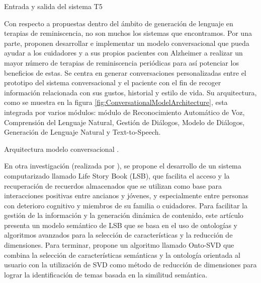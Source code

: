 %
{Entrada y salida del sistema T5}

Con respecto a propuestas dentro del ámbito de generación de lenguaje en terapias de reminiscencia, no son muchos los sistemas que encontramos. Por una parte, \citep{MoralesdeJess2020ACM} proponen desarrollar e implementar un modelo conversacional que pueda ayudar a los cuidadores y a sus propios pacientes con Alzheimer a realizar un mayor número de terapias de reminiscencia periódicas para así potenciar los beneficios de estas. Se centra en generar conversaciones personalizadas entre el prototipo del sistema conversacional y el paciente con el fin de recoger información relacionada con sus gustos, historial y estilo de vida. Su arquitectura, como se muestra en la figura \ref{fig:ConversationalModelArchitecture}, esta integrada por varios módulos: módulo de Reconocimiento Automático de Voz, Comprensión del Lenguaje Natural, Gestión de Diálogos, Modelo de Diálogos, Generación de Lenguaje Natural y Text-to-Speech.


%
{Arquitectura modelo conversacional \citep{MoralesdeJess2020ACM}.}

En otra investigación (realizada por \cite{shi2012user}), se propone el desarrollo de un sistema computarizado llamado Life Story Book (LSB), que facilita el acceso y la recuperación de recuerdos almacenados que se utilizan como base para interacciones positivas entre ancianos y jóvenes, y especialmente entre personas con deterioro cognitivo y miembros de su familia o cuidadores. Para facilitar la gestión de la información y la generación dinámica de contenido, este artículo presenta un modelo semántico de LSB que se basa en el uso de ontologías y algoritmos avanzados para la selección de características y la reducción de dimensiones. Para terminar, propone un algoritmo llamado Onto-SVD que combina la selección de características semánticas y la ontología orientada al usuario con  la utilización de SVD como método de reducción de dimensiones para lograr la identificación de temas basada en la similitud semántica.

